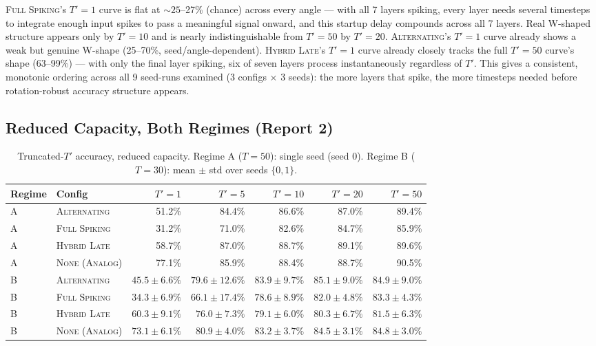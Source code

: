 \documentclass[11pt]{article}
\newcommand{\None}{\textsc{None (Analog)}}
\newcommand{\Alternating}{\textsc{Alternating}}
\newcommand{\FullSpiking}{\textsc{Full Spiking}}
\newcommand{\HybridLate}{\textsc{Hybrid Late}}
\begin{document}
\FloatBarrier
\FullSpiking's $T'{=}1$ curve is flat at $\sim 25$--27\% (chance) across every angle --- with all 7
layers spiking, every layer needs several timesteps to integrate enough input spikes to pass a
meaningful signal onward, and this startup delay compounds across all 7 layers. Real W-shaped structure
appears only by $T'{=}10$ and is nearly indistinguishable from $T'{=}50$ by $T'{=}20$. \Alternating's
$T'{=}1$ curve already shows a weak but genuine W-shape (25--70\%, seed/angle-dependent). \HybridLate's
$T'{=}1$ curve already closely tracks the full $T'{=}50$ curve's shape (63--99\%) --- with only the final
layer spiking, six of seven layers process instantaneously regardless of $T'$. This gives a consistent,
monotonic ordering across all 9 seed-runs examined (3 configs $\times$ 3 seeds): the more layers that
spike, the more timesteps needed before rotation-robust accuracy structure appears.

\subsection{Reduced Capacity, Both Regimes (Report 2)}

\begin{table}[H]
\centering
\small
\begin{tabular}{@{}llrrrrr@{}}
\toprule
\textbf{Regime} & \textbf{Config} & $T'{=}1$ & $T'{=}5$ & $T'{=}10$ & $T'{=}20$ & $T'{=}50$ \\
\midrule
A & \Alternating & 51.2\% & 84.4\% & 86.6\% & 87.0\% & 89.4\% \\
A & \FullSpiking & 31.2\% & 71.0\% & 82.6\% & 84.7\% & 85.9\% \\
A & \HybridLate & 58.7\% & 87.0\% & 88.7\% & 89.1\% & 89.6\% \\
A & \None & 77.1\% & 85.9\% & 88.4\% & 88.7\% & 90.5\% \\
\midrule
B & \Alternating & $45.5\pm6.6\%$ & $79.6\pm12.6\%$ & $83.9\pm9.7\%$ & $85.1\pm9.0\%$ & $84.9\pm9.0\%$ \\
B & \FullSpiking & $34.3\pm6.9\%$ & $66.1\pm17.4\%$ & $78.6\pm8.9\%$ & $82.0\pm4.8\%$ & $83.3\pm4.3\%$ \\
B & \HybridLate & $60.3\pm9.1\%$ & $76.0\pm7.3\%$ & $79.1\pm6.0\%$ & $80.3\pm6.7\%$ & $81.5\pm6.3\%$ \\
B & \None & $73.1\pm6.1\%$ & $80.9\pm4.0\%$ & $83.2\pm3.7\%$ & $84.5\pm3.1\%$ & $84.8\pm3.0\%$ \\
\bottomrule
\end{tabular}
\caption{Truncated-$T'$ accuracy, reduced capacity. Regime A ($T{=}50$): single seed (seed 0). Regime B
($T{=}30$): mean $\pm$ std over seeds $\{0,1\}$.}
\end{table}
\end{document}
